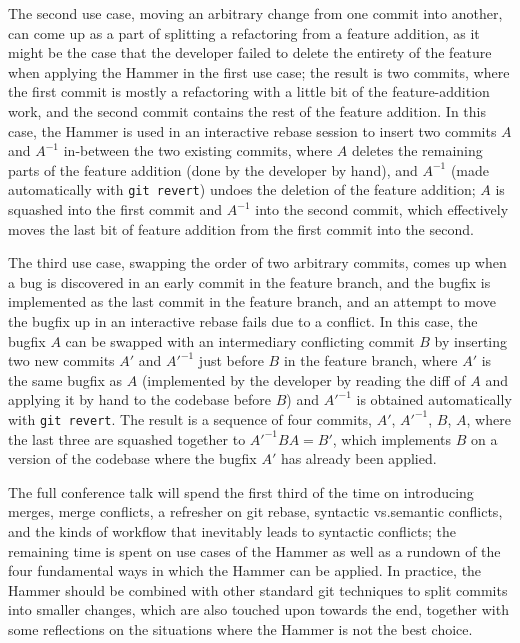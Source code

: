 \documentclass[a4paper]{lipics-v2021}
\begin{document}
The second use case, moving an arbitrary change from one commit into another, can come up as a part of splitting a refactoring from a feature addition, as it might be the case that the developer failed to delete the entirety of the feature when applying the Hammer in the first use case; the result is two commits, where the first commit is mostly a refactoring with a little bit of the feature-addition work, and the second commit contains the rest of the feature addition. In this case, the Hammer is used in an interactive rebase session to insert two commits $A$ and $A^{-1}$ in-between the two existing commits, where $A$ deletes the remaining parts of the feature addition (done by the developer by hand), and $A^{-1}$ (made automatically with \verb`git revert`) undoes the deletion of the feature addition; $A$ is squashed into the first commit and $A^{-1}$ into the second commit, which effectively moves the last bit of feature addition from the first commit into the second.

The third use case, swapping the order of two arbitrary commits, comes up when a bug is discovered in an early commit in the feature branch, and the bugfix is implemented as the last commit in the feature branch, and an attempt to move the bugfix up in an interactive rebase fails due to a conflict. In this case, the bugfix $A$ can be swapped with an intermediary conflicting commit $B$ by inserting two new commits $A'$ and $A'^{-1}$ just before $B$ in the feature branch, where $A'$ is the same bugfix as $A$ (implemented by the developer by reading the diff of $A$ and applying it by hand to the codebase before $B$) and $A'^{-1}$ is obtained automatically with \verb`git revert`. The result is a sequence of four commits, $A'$, $A'^{-1}$, $B$, $A$, where the last three are squashed together to $A'^{-1} B A = B'$, which implements $B$ on a version of the codebase where the bugfix $A'$ has already been applied.

The full conference talk will spend the first third of the time on introducing merges, merge conflicts, a refresher on git rebase, syntactic vs.\@ semantic conflicts, and the kinds of workflow that inevitably leads to syntactic conflicts; the remaining time is spent on use cases of the Hammer as well as a rundown of the four fundamental ways in which the Hammer can be applied. In practice, the Hammer should be combined with other standard git techniques to split commits into smaller changes, which are also touched upon towards the end, together with some reflections on the situations where the Hammer is not the best choice.
\end{document}
